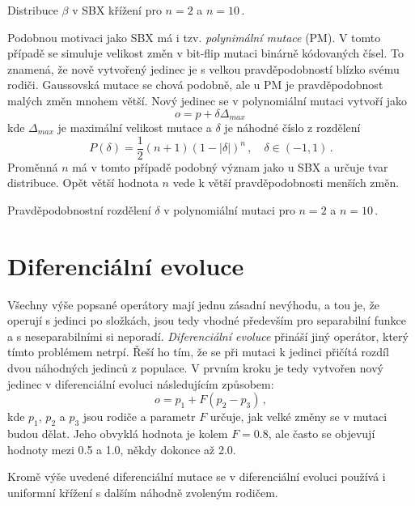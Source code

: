 \begin{marginfigure}[-12\baselineskip]
\centering

\caption{Distribuce $\beta$ v SBX křížení pro $n=2$ a $n=10\,.$}
\label{fig:sbx_beta}
\end{marginfigure}

Podobnou motivaci jako SBX má i tzv. \emph{polynimální mutace} (PM)\cite{Deb96acombined}. V tomto případě se simuluje velikost změn v bit-flip mutaci binárně kódovaných čísel. To znamená, že nově vytvořený jedinec je s velkou pravděpodobností blízko svému rodiči. Gaussovská mutace se chová podobně, ale u PM je pravděpodobnost malých změn mnohem větší. Nový jedinec se v polynomiální mutaci vytvoří jako 
$$o = p + \delta \Delta_{max}\,$$ kde $\Delta_{max}$ je maximální velikost mutace a $\delta$ je náhodné číslo z rozdělení $$P(\delta) = \frac{1}{2}(n+1)(1-|\delta|)^n\,, \quad \delta \in (-1, 1)\,.$$ Proměnná $n$ má v tomto případě podobný význam jako u SBX a určuje tvar distribuce. Opět větší hodnota $n$ vede k větší pravděpodobnosti menších změn.

\begin{marginfigure}[-10\baselineskip]
\centering

\caption{Pravděpodobnostní rozdělení $\delta$ v polynomiální mutaci pro $n=2$ a $n=10\,.$}
\end{marginfigure}

\section{Diferenciální evoluce}

Všechny výše popsané operátory mají jednu zásadní nevýhodu, a tou je, že operují s jedinci po složkách, jsou tedy vhodné především pro separabilní funkce a s neseparabilními si neporadí. \emph{Diferenciální evoluce}\cite{Storn1997} přináší jiný operátor, který tímto problémem netrpí. Řeší ho tím, že se při mutaci k jedinci přičítá rozdíl dvou náhodných jedinců z populace. V prvním kroku je tedy vytvořen nový jedinec v diferenciální evoluci následujícím způsobem: 
$$o = p_1 + F(p_2 - p_3)\,,$$ kde $p_1$, $p_2$ a $p_3$ jsou rodiče a parametr $F$ určuje, jak velké změny se v mutaci budou dělat. Jeho obvyklá hodnota je kolem $F=0.8$, ale často se objevují hodnoty mezi 0.5 a 1.0, někdy dokonce až 2.0. 

Kromě výše uvedené diferenciální mutace se v diferenciální evoluci používá i uniformní křížení s dalším náhodně zvoleným rodičem. 
